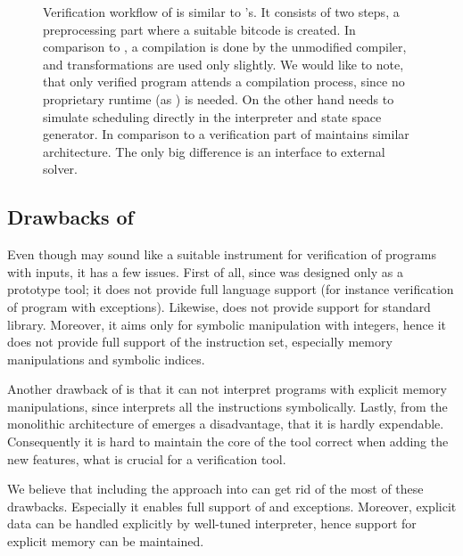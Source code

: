\begin{figure}[!ht]
{
}
\caption{ Verification workflow of \SymDIVINE is similar to \DIVINE{}'s. It
    consists of two steps, a preprocessing part where a suitable \LLVM bitcode
    is created. In comparison to \DIVINE, a compilation is done by the unmodified
    compiler, and \LART transformations are used only slightly. We would like to
    note, that only verified program attends a compilation process, since no
    \SymDIVINE proprietary runtime (as \DIOS) is needed. On the other hand
    \SymDIVINE needs to simulate scheduling directly in the interpreter and state space generator. In comparison to \DIVINE a verification part of \SymDIVINE
    maintains similar architecture. The only big difference is an interface to
    external \SMT solver.}\label{fig:symdivine}
\end{figure}


\subsection{Drawbacks of \SymDIVINE}
Even though \SymDIVINE may sound like a suitable instrument for verification of
programs with inputs, it has a few issues. First of all, since
\SymDIVINE was designed only as a prototype tool; it does not provide full \Cpp{}
language support (for instance verification of program with exceptions).
Likewise, \SymDIVINE does not provide support for \Cpp{} standard library.
Moreover, it aims only for symbolic manipulation with integers, hence it
does not provide full support of the \LLVM instruction set, especially memory
manipulations and symbolic indices.

Another drawback of \SymDIVINE is that it can not interpret programs with
explicit memory manipulations, since \SymDIVINE interprets all the
instructions symbolically. Lastly, from the monolithic architecture of \SymDIVINE emerges a
disadvantage, that it is hardly expendable. Consequently it is hard to maintain
the core of the tool correct when adding the new features, what is
crucial for a verification tool.

We believe that including the \SymDIVINE approach into \DIVINE can get rid
of the most of these drawbacks. Especially it enables full support of \LLVM and
\Cpp{} exceptions. Moreover, explicit data can be handled explicitly by
well-tuned \DIVINE interpreter, hence support for explicit memory can be
maintained.

